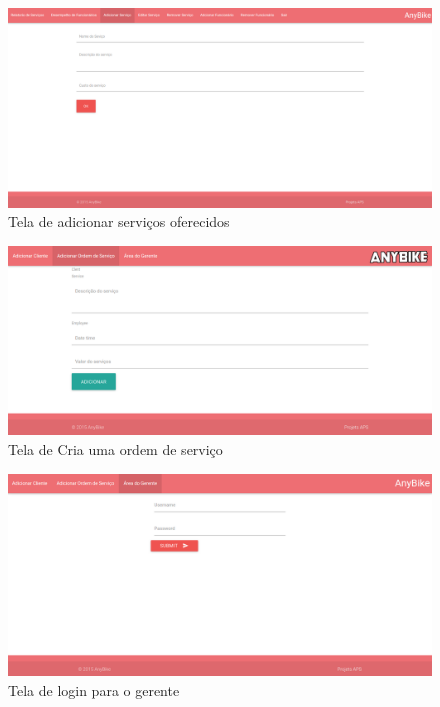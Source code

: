 \documentclass[
	12pt,				%
	openright,
	oneside,			%
	a4paper,			%
	chapter=TITLE,		%
	brazil				%
	]{abntex2}
\begin{document}
\begin{figure}[htb]
	\caption{Tela de adicionar serviços oferecidos}
	\begin{center}
	    \includegraphics[scale=0.3]{Arquivos/adicionar_servico}  
	\end{center}
\end{figure}


\begin{figure}[htb]
	\caption{Tela de Cria uma ordem de serviço}
	\begin{center}
	    \includegraphics[scale=0.3]{Arquivos/ordem_servico}  
	\end{center}
\end{figure}


\begin{figure}[htb]
	\caption{Tela de login para o gerente}
	\begin{center}
	    \includegraphics[scale=0.3]{Arquivos/login}  
	\end{center}
\end{figure}
\end{document}
